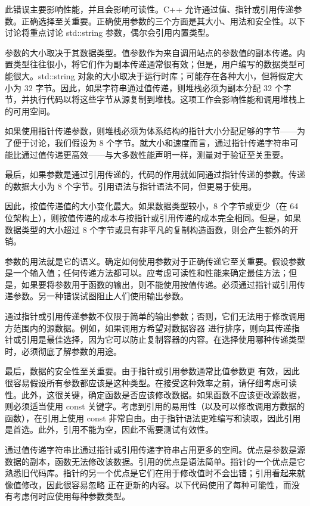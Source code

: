 此错误主要影响性能，并且会影响可读性。C++ 允许通过值、指针或引用传递参数。正确选择至关重要。正确使用参数的三个方面是其大小、用法和安全性。以下讨论将重点讨论 std::string 参数，偶尔会引用内置类型。

参数的大小取决于其数据类型。值参数作为来自调用站点的参数值的副本传递。内置类型往往很小，将它们作为副本传递通常很有效；但是，用户编写的数据类型可能很大。std::string 对象的大小取决于运行时库；可能存在各种大小，但将假定大小为 32 字节。因此，如果字符串通过值传递，则堆栈必须为副本分配 32 个字节，并执行代码以将这些字节从源复制到堆栈。这项工作会影响性能和调用堆栈上的可用空间。

如果使用指针传递参数，则堆栈必须为体系结构的指针大小分配足够的字节——为了便于讨论，我们假设为 8 个字节。就大小和速度而言，通过指针传递字符串可能比通过值传递更高效——与大多数性能声明一样，测量对于验证至关重要。

最后，如果参数是通过引用传递的，代码的作用就如同通过指针传递的参数。传递的数据大小为 8 个字节。引用语法与指针语法不同，但更易于使用。

因此，按值传递值的大小变化最大。如果数据类型较小，8 个字节或更少（在 64 位架构上），则按值传递的成本与按指针或引用传递的成本完全相同。但是，如果数据类型的大小超过 8 个字节或具有非平凡的复制构造函数，则会产生额外的开销。

参数的用法就是它的语义。确定如何使用参数对于正确传递它至关重要。假设参数是一个输入值；任何传递方法都可以。应考虑可读性和性能来确定最佳方法；但是，如果要将参数用于函数的输出，则不能使用按值传递。必须通过指针或引用传递参数。另一种错误试图阻止人们使用输出参数。

通过指针或引用传递参数不仅限于简单的输出参数；否则，它们无法用于修改调用方范围内的源数据。例如，如果调用方希望对数据容器 进行排序，则向其传递指针或引用是最佳选择，因为它可以防止复制容器的内容。在选择使用哪种传递类型时，必须彻底了解参数的用途。

最后，数据的安全性至关重要。由于指针或引用参数通常比值参数更 有效，因此很容易假设所有参数都应该是这种类型。在接受这种效率之前，请仔细考虑可读性。此外，这很关键，确定函数是否应该修改数据。如果函数不应该更改源数据，则必须适当使用 const 关键字。考虑到引用的易用性（以及可以修改调用方数据的函数），在引用上使用 const 非常自由。由于指针语法更难编写和读取，因此引用是首选。此外，引用不能为空，因此不需要测试有效性。


通过值传递字符串比通过指针或引用传递字符串占用更多的空间。优点是参数是源数据的副本，函数无法修改该数据。引用的优点是语法简单。指针的一个优点是它熟悉旧代码库。指针的另一个优点是它们在用于修改值时不会出错；引用看起来就像值修改，因此很容易忽略 正在更新的内容。以下代码使用了每种可能性，而没有考虑何时应使用每种参数类型。

